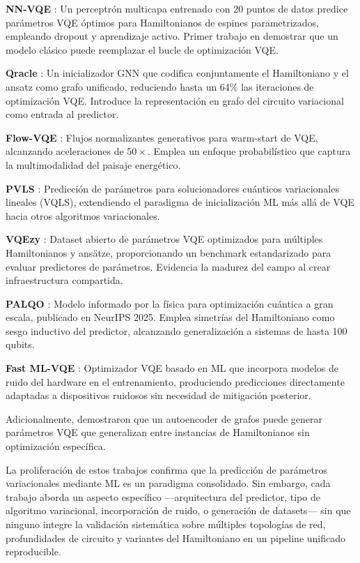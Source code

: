 \documentclass[11pt,a4paper,spanish]{book}
\begin{document}
\textbf{NN-VQE} \citep{miao2024}: Un perceptrón multicapa entrenado con 20 puntos de datos predice parámetros VQE óptimos para Hamiltonianos de espines parametrizados, empleando dropout y aprendizaje activo. Primer trabajo en demostrar que un modelo clásico puede reemplazar el bucle de optimización VQE.

\textbf{Qracle} \citep{zhang2025}: Un inicializador GNN que codifica conjuntamente el Hamiltoniano y el ansatz como grafo unificado, reduciendo hasta un 64\% las iteraciones de optimización VQE. Introduce la representación en grafo del circuito variacional como entrada al predictor.

\textbf{Flow-VQE} \citep{zou2026}: Flujos normalizantes generativos para warm-start de VQE, alcanzando aceleraciones de $50\times$. Emplea un enfoque probabilístico que captura la multimodalidad del paisaje energético.

\textbf{PVLS} \citep{yang2024pvls}: Predicción de parámetros para solucionadores cuánticos variacionales lineales (VQLS), extendiendo el paradigma de inicialización ML más allá de VQE hacia otros algoritmos variacionales.

\textbf{VQEzy} \citep{zhang2025vqezy}: Dataset abierto de parámetros VQE optimizados para múltiples Hamiltonianos y ansätze, proporcionando un benchmark estandarizado para evaluar predictores de parámetros. Evidencia la madurez del campo al crear infraestructura compartida.

\textbf{PALQO} \citep{huang2025palqo}: Modelo informado por la física para optimización cuántica a gran escala, publicado en NeurIPS 2025. Emplea simetrías del Hamiltoniano como sesgo inductivo del predictor, alcanzando generalización a sistemas de hasta 100 qubits.

\textbf{Fast ML-VQE} \citep{karim2025}: Optimizador VQE basado en ML que incorpora modelos de ruido del hardware en el entrenamiento, produciendo predicciones directamente adaptadas a dispositivos ruidosos sin necesidad de mitigación posterior.

Adicionalmente, \citet{lee2026} demostraron que un autoencoder de grafos puede generar parámetros VQE que generalizan entre instancias de Hamiltonianos sin optimización específica.

La proliferación de estos trabajos confirma que la predicción de parámetros variacionales mediante ML es un paradigma consolidado. Sin embargo, cada trabajo aborda un aspecto específico ---arquitectura del predictor, tipo de algoritmo variacional, incorporación de ruido, o generación de datasets--- sin que ninguno integre la validación sistemática sobre múltiples topologías de red, profundidades de circuito y variantes del Hamiltoniano en un pipeline unificado reproducible.
\end{document}

